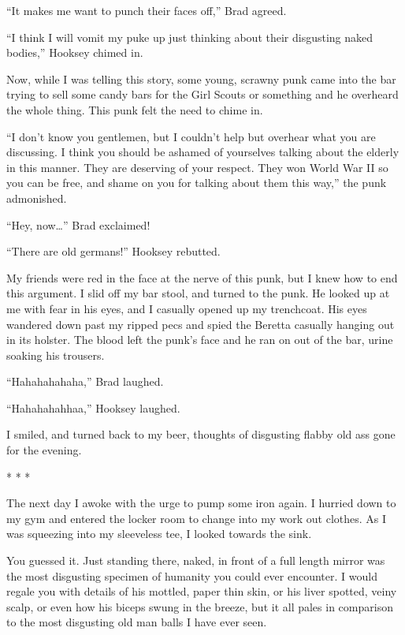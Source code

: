 ``It makes me want to punch their faces off,'' Brad agreed.

``I think I will vomit my puke up just thinking about their
disgusting naked bodies,'' Hooksey chimed in.



Now, while I was telling this story, some young, scrawny punk came
into the bar trying to sell some candy bars for the Girl Scouts or
something and he overheard the whole thing. This punk felt the need
to chime in.



``I don't know you gentlemen, but I couldn't help but overhear what
you are discussing. I think you should be ashamed of yourselves
talking about the elderly in this manner. They are deserving of
your respect. They won World War II so you can be free, and shame
on you for talking about them this way,'' the punk admonished.



``Hey, now{\ldots}'' Brad exclaimed!

``There are old germans!'' Hooksey rebutted.



My friends were red in the face at the nerve of this punk, but I
knew how to end this argument. I slid off my bar stool, and turned
to the punk. He looked up at me with fear in his eyes, and I
casually opened up my trenchcoat. His eyes wandered down past my
ripped pecs and spied the Beretta casually hanging out in its
holster. The blood left the punk's face and he ran on out of the
bar, urine soaking his trousers.



``Hahahahahaha,'' Brad laughed.

``Hahahahahhaa,'' Hooksey laughed.



I smiled, and turned back to my beer, thoughts of disgusting flabby
old ass gone for the evening.



* * *




The next day I awoke with the urge to pump some iron again. I
hurried down to my gym and entered the locker room to change into
my work out clothes. As I was squeezing into my sleeveless tee, I
looked towards the sink.



You guessed it. Just standing there, naked, in front of a full
length mirror was the most disgusting specimen of humanity you
could ever encounter. I would regale you with details of his
mottled, paper thin skin, or his liver spotted, veiny scalp, or
even how his biceps swung in the breeze, but it all pales in
comparison to the most disgusting old man balls I have ever
seen.



